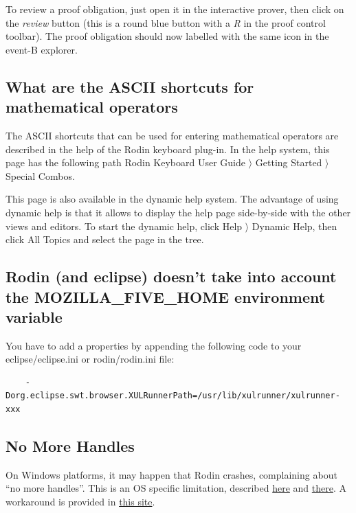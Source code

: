 To review a proof obligation, just open it in the interactive prover, then click on the \emph{review} button (this is a round blue button with a \emph{R} in the proof control toolbar). The proof obligation should now labelled with the same icon in the event-B explorer. 

\subsection{What are the ASCII shortcuts for mathematical operators}

The ASCII shortcuts that can be used for entering mathematical operators are described in the help of the Rodin keyboard plug-in. In the help system, this page has the following path \textsf{Rodin Keyboard User Guide $\rangle$ Getting Started $\rangle$ Special Combos}. 

This page is also available in the dynamic help system. The advantage of using dynamic help is that it allows to display the help page side-by-side with the other views and editors. To start the dynamic help, click \textsf{Help $\rangle$ Dynamic Help}, then click \textsf{All Topics} and select the page in the tree. 

\subsection{Rodin (and eclipse) doesn't take into account the MOZILLA\_FIVE\_HOME environment variable}

You have to add a properties by appending the following code to your \textsf{eclipse/eclipse.ini} or \textsf{rodin/rodin.ini} file: 

\begin{verbatim} 
	-Dorg.eclipse.swt.browser.XULRunnerPath=/usr/lib/xulrunner/xulrunner-xxx 
\end{verbatim} 

\subsection{No More Handles}

On Windows platforms, it may happen that Rodin crashes, complaining about ``no more handles''. This is an OS specific limitation, described \href{http://journals.jevon.org/users/jevon-phd/entry/19833}{here} and \href{https://bugs.eclipse.org/bugs/show_bug.cgi?id=211124}{there}. A workaround is provided in \href{http://blogs.msdn.com/b/ntdebugging/archive/2007/01/04/desktop-heap-overview.aspx}{this site}. 

